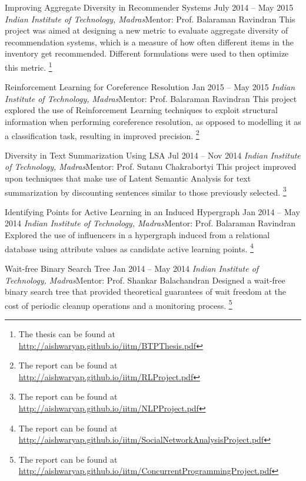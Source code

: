 \documentclass[letterpaper,10pt]{resume}
\begin{document}
{\begin{itemize}
    \credentialtwo
    {{Improving Aggregate Diversity in Recommender Systems}}
    {\sf July 2014 -- May 2015}
    {\it Indian Institute of Technology, Madras}{\textsf{Mentor: Prof. Balaraman Ravindran}}
    {}
    { 
    \small This project was aimed at designing a new metric to evaluate aggregate diversity of recommendation systems, which is a measure of how often different items in the inventory get recommended. Different formulations were used to then optimize this metric. \footnote{The thesis can be found at \url{http://aishwaryap.github.io/iitm/BTPThesis.pdf}}
    }
   \vspace{0.2cm}
   
    \credentialtwo
    {{Reinforcement Learning for Coreference Resolution}}
    {\sf Jan 2015 -- May 2015}
    {\it Indian Institute of Technology, Madras}{\textsf{Mentor: Prof. Balaraman Ravindran}}
    {}
    { 
    \small This project explored the use of Reinforcement Learning techniques to exploit structural information when performing coreference resolution, as opposed to modelling it as a classification task, resulting in improved precision. \footnote{The report can be found at \url{http://aishwaryap.github.io/iitm/RLProject.pdf}}
    }
   \vspace{0.2cm}
   
    \credentialtwo
    {{Diversity in Text Summarization Using LSA}}
    {\sf Jul 2014 -- Nov 2014}
    {\it Indian Institute of Technology, Madras}{\textsf{Mentor: Prof. Sutanu Chakrabortyi}}
    {}
    { 
    \small This project improved upon techniques that make use of Latent Semantic Analysis for text summarization by discounting sentences similar to those previously selected. \footnote{The report can be found at \url{http://aishwaryap.github.io/iitm/NLPProject.pdf}}
    }
   \vspace{0.2cm}
   
   \credentialtwo
    {{Identifying Points for Active Learning in an Induced Hypergraph}}
    {\sf Jan 2014 -- May 2014}
    {\it Indian Institute of Technology, Madras}{\textsf{Mentor: Prof. Balaraman Ravindran}}
    {}
    { 
    \small Explored the use of influencers in a hypergraph induced from a relational database using attribute values as candidate active learning points. \footnote{The report can be found at \url{http://aishwaryap.github.io/iitm/SocialNetworkAnalysisProject.pdf}}
    }
   \vspace{0.2cm}
   
   \credentialtwo
    {{Wait-free Binary Search Tree}}
    {\sf Jan 2014 -- May 2014}
    {\it Indian Institute of Technology, Madras}{\textsf{Mentor: Prof. Shankar Balachandran}}
    {}
    { 
    \small Designed a wait-free binary search tree that provided theoretical guarantees of wait freedom at the cost of periodic cleanup operations and a monitoring process. \footnote{The report can be found at \url{http://aishwaryap.github.io/iitm/ConcurrentProgrammingProject.pdf}}
    }
   \vspace{0.2cm}
   

\end{itemize}}
\end{document}
